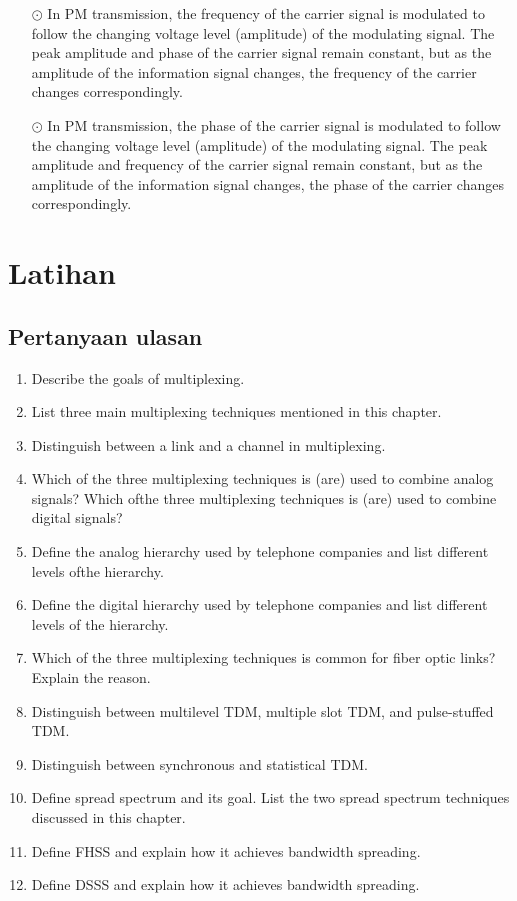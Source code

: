\begin{itemize}
  \item[$\odot$] In PM transmission, the frequency of the carrier signal is modulated to follow the changing voltage level (amplitude) of the modulating signal. The peak amplitude and phase of the carrier signal remain constant, but as the amplitude of the information signal changes, the frequency of the carrier changes correspondingly.
  \item[$\odot$] In PM transmission, the phase of the carrier signal is modulated to follow the changing voltage level (amplitude) of the modulating signal. The peak amplitude and frequency of the carrier signal remain constant, but as the amplitude of the information signal changes, the phase of the carrier changes correspondingly.
\end{itemize}

\section{Latihan}

\subsection*{Pertanyaan ulasan}

\begin{enumerate}
  \item Describe the goals of multiplexing.
  \item List three main multiplexing techniques mentioned in this chapter. 
  \item Distinguish between a link and a channel in multiplexing. 
  \item Which of the three multiplexing techniques is (are) used to combine analog signals? Which ofthe three multiplexing techniques is (are) used to combine digital signals? 
  \item Define the analog hierarchy used by telephone companies and list different levels ofthe hierarchy. 
  \item Define the digital hierarchy used by telephone companies and list different levels of the hierarchy. 
  \item Which of the three multiplexing techniques is common for fiber optic links? Explain the reason. 
  \item Distinguish between multilevel TDM, multiple slot TDM, and pulse-stuffed TDM. 
  \item Distinguish between synchronous and statistical TDM. 
  \item Define spread spectrum and its goal. List the two spread spectrum techniques discussed in this chapter. 
  \item Define FHSS and explain how it achieves bandwidth spreading. 
  \item Define DSSS and explain how it achieves bandwidth spreading.
\end{enumerate}

